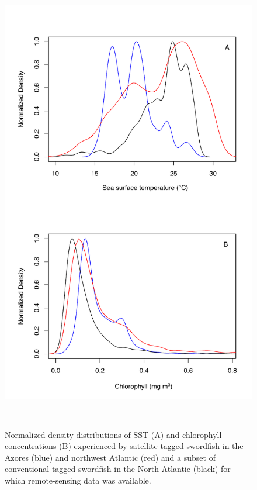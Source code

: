 \begin{figure}[htbp]
\centering
\includegraphics[height=8in, keepaspectratio]{images/A4_FigS5.pdf}
\caption[Distribution of SST and chlorophyll concentrations experienced by satellite and conventional-tagged swordfish in the North Atlantic]{Normalized density distributions of SST (A) and chlorophyll concentrations (B) experienced by satellite-tagged swordfish in the Azores (blue) and northwest Atlantic (red) and a subset of conventional-tagged swordfish in the North Atlantic (black) for which remote-sensing data was available.}
\label{fig:a4f5}
\end{figure}
